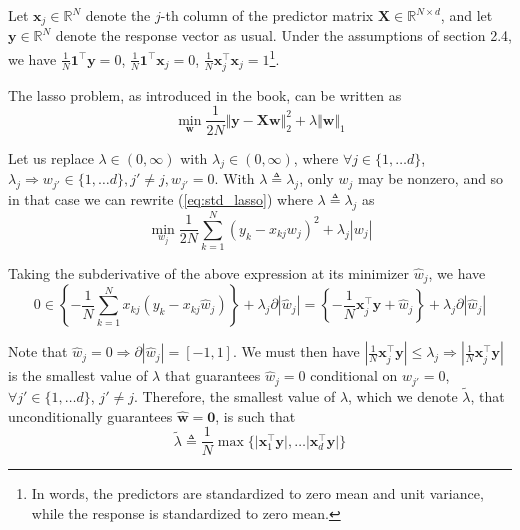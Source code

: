 \documentclass{article}
\numberwithin{equation}{section}
\begin{document}
 \label{sec:2.1}

Let $ \mathbf{x}_j  \in \mathbb{R}^N $ denote the $ j $-th column of the
predictor matrix $ \mathbf{X} \in \mathbb{R}^{N \times d} $, and let
$ \mathbf{y} \in \mathbb{R}^N $ denote the response vector as usual. Under
the assumptions of section 2.4, we have $ \frac{1}{N}\mathbf{1}^\top
\mathbf{y} = 0 $, $ \frac{1}{N}\mathbf{1}^\top\mathbf{x}_j = 0 $,
$ \frac{1}{N}\mathbf{x}_j^\top\mathbf{x}_j = 1 $\footnote{
    In words, the predictors are standardized to zero mean and unit variance,
    while the response is standardized to zero mean.
}.

\medskip

The lasso problem, as introduced in the book, can be written as
\begin{equation} \label{eq:std_lasso}
    \min_\mathbf{w}\frac{1}{2N}\Vert\mathbf{y} - \mathbf{Xw}\Vert_2^2 +
    \lambda\Vert\mathbf{w}\Vert_1
\end{equation}

Let us replace $ \lambda \in (0, \infty) $ with $ \lambda_j \in
(0, \infty) $, where $ \forall j \in \{1, \ldots d\} $, $ \lambda_j
\Rightarrow w_{j'} \in \{1, \ldots d\}, j' \ne j, w_{j'} = 0 $.
With $ \lambda \triangleq \lambda_j $, only $ w_j $ may be nonzero, and
so in that case we can rewrite (\ref{eq:std_lasso}) where
$ \lambda \triangleq \lambda_j $ as
\begin{equation*}
    \min_{w_j}\frac{1}{2N}\sum_{k = 1}^N(y_k - x_{kj}w_j)^2 +
    \lambda_j|w_j|
\end{equation*}

Taking the subderivative of the above expression at its minimizer
$ \hat{w}_j $, we have
\begin{equation*}
    0 \in \left\{
        -\frac{1}{N}\sum_{k = 1}^Nx_{kj}(y_k - x_{kj}\hat{w}_j)
    \right\} +
    \lambda_j\partial|\hat{w}_j| =
    \left\{-\frac{1}{N}\mathbf{x}_j^\top\mathbf{y} + \hat{w}_j\right\} +
    \lambda_j\partial|\hat{w}_j|
\end{equation*}

Note that $ \hat{w}_j = 0 \Rightarrow \partial|\hat{w}_j| = [-1, 1] $. We
must then have $ \left|\frac{1}{N}\mathbf{x}_j^\top\mathbf{y}\right| \le
\lambda_j \Rightarrow \left|\frac{1}{N}\mathbf{x}_j^\top\mathbf{y}\right| $
is the smallest value of $ \lambda $ that guarantees $ \hat{w}_j = 0 $
conditional on $ \hat{w}_{j'} = 0 $, $ \forall j' \in \{1, \ldots d\} $,
$ j' \ne j $. Therefore, the smallest value of $ \lambda $,
which we denote $ \tilde{\lambda} $, that unconditionally guarantees
$ \hat{\mathbf{w}} = \mathbf{0} $, is such that
\begin{equation*}
    \tilde{\lambda} \triangleq
    \frac{1}{N}\max\big\{
        \big|\mathbf{x}_1^\top\mathbf{y}\big|, \ldots
        \big|\mathbf{x}_d^\top\mathbf{y}\big|
    \big\}
\end{equation*}
\end{document}
